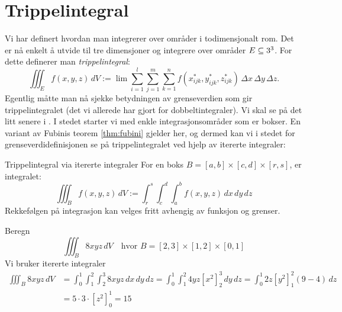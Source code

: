 \section{Trippelintegral}\label{sect:trippelint}

Vi har definert hvordan man integrerer over områder i todimensjonalt rom. Det er nå enkelt å utvide til tre dimensjoner og integrere over områder $E \subseteq 3^3$. For dette definerer man \emph{trippelintegral}:
\[
\iiint_E f(x, y, z)\, dV := \lim \sum_{i=1}^{l} \sum_{j=1}^{m} \sum_{k=1}^{n} f(x^{*}_{ijk}, y^{*}_{ijk}, z^{*}_{ijk}) \, \Delta x \, \Delta y \, \Delta z.
\]
Egentlig måtte man nå sjekke betydningen av grenseverdien som gir trippelintegralet (det vi allerede har gjort for dobbeltintegraler). Vi skal se på det litt senere i . I stedet starter vi med enkle integrasjonsområder som er bokser. En variant av Fubinis teorem \ref{thm:fubini} gjelder her, og dermed kan vi i stedet for grenseverdidefinisjonen se på trippelintegralet ved hjelp av itererte integraler:

\begin{defn}{Trippelintegral via itererte integraler}
For en boks $B = [a,b] \times [c,d] \times [r,s]$, er integralet:
\[
\iiint_B f(x, y, z)\, dV := \int_r^s \int_c^d \int_a^b f(x, y, z)\, dx\, dy\, dz
\]
Rekkefølgen på integrasjon kan velges fritt avhengig av funksjon og grenser.
\end{defn}

\begin{eks}{} Beregn 
\[
\iiint_B 8xyz\, dV \quad \text{hvor } B = [2, 3] \times [1, 2] \times [0, 1]
\]
Vi bruker itererte integraler
\begin{align*}
\iiint_B 8xyz\, dV&=\int_0^1 \int_1^2 \int_2^3 8xyz \, dx\,dy\,dz = \int_0^1 \int_1^2 4yz[x^2]_2^3\, dy\, dz = \int_0^1 2z[y^2]_1^2 (9-4)\,dz\\
&= 5\cdot 3 \cdot [z^2]_0^1 =15
\end{align*}
\end{eks}

